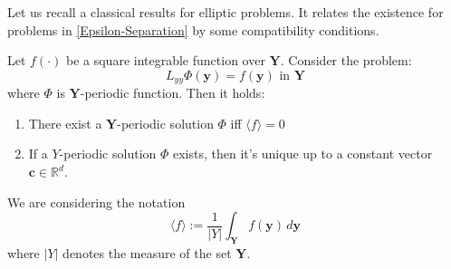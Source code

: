 Let us recall a classical results for elliptic problems. It relates the existence for problems in \ref{Epsilon-Separation} by some compatibility conditions.
\begin{lem}
\label{ExistenceLemma}
Let $f(\cdot)$ be a square integrable function over $\mathbf{Y}$. Consider the problem:
\begin{equation*}
    L_{yy} \Phi(\mathbf{y}) = f(\mathbf{y}) \text{ in } \mathbf{Y}
\end{equation*}
where $\Phi$ is $\mathbf{Y}$-periodic function. Then it holds:
\begin{enumerate}
    \item There exist a $\mathbf{Y}$-periodic solution $\Phi$ iff $\langle f \rangle = 0$
    \item If a $Y$-periodic solution $\Phi$ exists, then it's unique up to a constant vector $\mathbf{c} \in \mathbb{R}^d$.
\end{enumerate}
\end{lem}

\begin{rem}
We are considering the notation
\begin{equation*}
    \langle f \rangle := \frac{1}{\vert Y \vert} \int_{\mathbf{Y}} f(\mathbf{y}) \, d\mathbf{y}
\end{equation*}
where $\vert Y \vert$ denotes the measure of the set $\mathbf{Y}$.
\end{rem}

